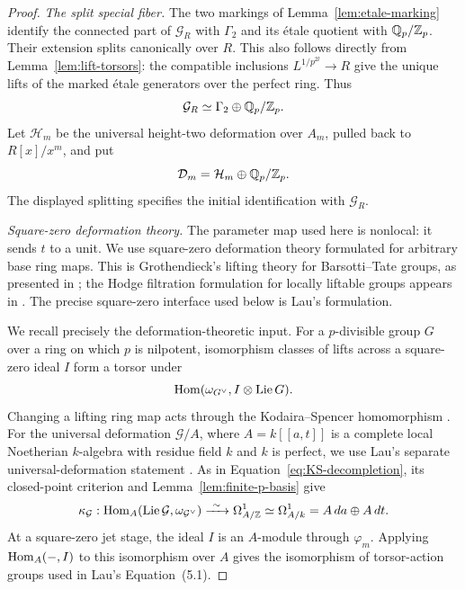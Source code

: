 \begin{proof}
\emph{The split special fiber.}
The two markings of Lemma~\ref{lem:etale-marking} identify the
connected part of $\mathcal G_R$ with $\Gamma_2$ and its
\'{e}tale quotient with $\mathbb Q_p/\mathbb Z_p$.
Their extension splits canonically over $R$.  This also follows
directly from Lemma~\ref{lem:lift-torsors}: the compatible inclusions
$L^{1/p^{2l}}\to R$ give the unique lifts of the marked
\'{e}tale generators over the perfect ring.  Thus
\[
  \mathcal G_R\simeq\Gamma_2\oplus\mathbb Q_p/\mathbb Z_p.
\]
Let $\mathcal H_m$ be the universal height-two deformation over
$A_m$, pulled back to $R[x]/x^m$, and put
\[
  \mathcal D_m=\mathcal H_m\oplus\mathbb Q_p/\mathbb Z_p.
\]
The displayed splitting specifies the initial identification with
$\mathcal G_R$.

\smallskip\noindent\emph{Square-zero deformation theory.}
The parameter map used here is nonlocal: it sends $t$ to a unit. We use
square-zero deformation theory formulated for arbitrary base ring maps.
This is Grothendieck's lifting theory for Barsotti--Tate groups, as
presented in \cite[Theorem~4.4 and Corollary~4.7]{Illusie85}; the Hodge
filtration formulation for locally liftable groups appears in
\cite[Chapter~V, Theorem~(1.6)]{Messing72}. The precise square-zero
interface used below is Lau's formulation.

We recall precisely the deformation-theoretic input.  For a
$p$-divisible group $G$ over a ring on which $p$ is nilpotent, isomorphism
classes of lifts across a square-zero ideal $I$ form a torsor under
\[
  \operatorname{Hom}(\omega_{G^\vee},I\otimes\operatorname{Lie} G).
\]
Changing a lifting ring map acts through the Kodaira--Spencer
homomorphism \cite[Theorem~5.1 and Equation~(5.1)]{Lau10}.
For the universal deformation \(\mathcal G/A\), where \(A=k[[a,t]]\)
is a complete local Noetherian \(k\)-algebra with residue field \(k\)
and \(k\) is perfect, we use Lau's separate universal-deformation
statement
\cite[paragraph following Equation~(5.2), p.~227]{Lau10}.
As in Equation~\eqref{eq:KS-decompletion}, its closed-point criterion
and Lemma~\ref{lem:finite-p-basis} give
\[
 \kappa_{\mathcal G}:
 \operatorname{Hom}_A(\operatorname{Lie}\mathcal G,\omega_{\mathcal G^\vee})
 \xrightarrow{\ \sim\ }\Omega^1_{A/\mathbb Z}
 \simeq\Omega^1_{A/k}=A\,da\oplus A\,dt.
\]
At a square-zero jet stage, the ideal \(I\) is an \(A\)-module through
\(\varphi_m\). Applying \(\operatorname{Hom}_A(-,I)\) to this isomorphism over \(A\)
gives the isomorphism of torsor-action groups used in Lau's Equation~(5.1).


\end{proof}
